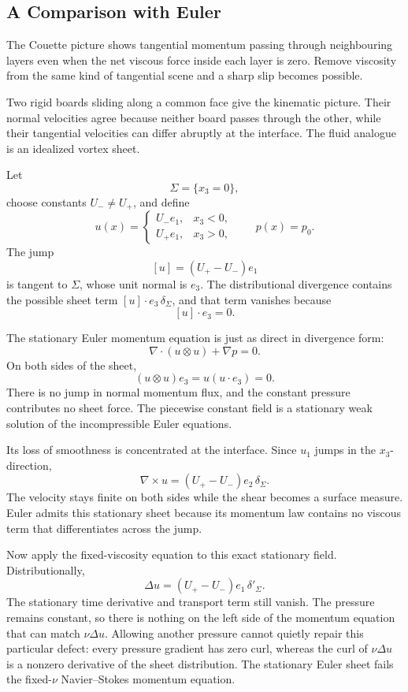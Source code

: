 \subsection{A Comparison with Euler}\label{sub:AComparisonWithEuler}

The Couette picture shows tangential momentum passing through neighbouring layers even when the net viscous force inside each layer is zero.
Remove viscosity from the same kind of tangential scene and a sharp slip becomes possible.

Two rigid boards sliding along a common face give the kinematic picture.
Their normal velocities agree because neither board passes through the other, while their tangential velocities can differ abruptly at the interface.
The fluid analogue is an idealized vortex sheet.

Let
\[
  \Sigma=\{x_3=0\},
\]
choose constants \(U_-\neq U_+\), and define
\[
  u(x)=
  \begin{cases}
    U_-e_1, & x_3<0,\\
    U_+e_1, & x_3>0,
  \end{cases}
  \qquad
  p(x)=p_0.
\]
The jump
\[
  [u]=(U_+-U_-)e_1
\]
is tangent to \(\Sigma\), whose unit normal is \(e_3\).
The distributional divergence contains the possible sheet term \([u]\cdot e_3\,\delta_\Sigma\), and that term vanishes because
\[
  [u]\cdot e_3=0.
\]

The stationary Euler momentum equation is just as direct in divergence form:
\[
  \nabla\cdot(u\otimes u)+\nabla p=0.
\]
On both sides of the sheet,
\[
  (u\otimes u)e_3=u(u\cdot e_3)=0.
\]
There is no jump in normal momentum flux, and the constant pressure contributes no sheet force.
The piecewise constant field is a stationary weak solution of the incompressible Euler equations.

Its loss of smoothness is concentrated at the interface.
Since \(u_1\) jumps in the \(x_3\)-direction,
\[
  \nabla\times u
  =
  (U_+-U_-)e_2\,\delta_\Sigma.
\]
The velocity stays finite on both sides while the shear becomes a surface measure.
Euler admits this stationary sheet because its momentum law contains no viscous term that differentiates across the jump.

Now apply the fixed-viscosity equation to this exact stationary field.
Distributionally,
\[
  \Delta u
  =
  (U_+-U_-)e_1\,\delta'_\Sigma.
\]
The stationary time derivative and transport term still vanish.
The pressure remains constant, so there is nothing on the left side of the momentum equation that can match \(\nu\Delta u\).
Allowing another pressure cannot quietly repair this particular defect: every pressure gradient has zero curl, whereas the curl of \(\nu\Delta u\) is a nonzero derivative of the sheet distribution.
The stationary Euler sheet fails the fixed-\(\nu\) Navier--Stokes momentum equation.


